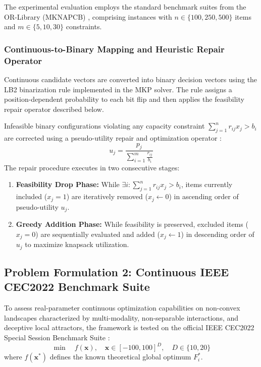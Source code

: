 \documentclass[review]{elsarticle}
\begin{document}
The experimental evaluation employs the standard benchmark suites from the OR-Library (MKNAPCB) \cite{chu1998genetic}, comprising instances with $n \in \{100, 250, 500\}$ items and $m \in \{5, 10, 30\}$ constraints.

\subsubsection{Continuous-to-Binary Mapping and Heuristic Repair Operator}

Continuous candidate vectors are converted into binary decision vectors using the LB2 binarization rule implemented in the MKP solver. The rule assigns a position-dependent probability to each bit flip and then applies the feasibility repair operator described below.

Infeasible binary configurations violating any capacity constraint $\sum_{j=1}^{n} r_{ij} x_j > b_i$ are corrected using a pseudo-utility repair and optimization operator \cite{chu1998genetic}:
\begin{equation}
u_j = \frac{p_j}{\displaystyle\sum_{i=1}^{m} \frac{r_{ij}}{b_i}}
\label{eq:pseudo_utility}
\end{equation}
The repair procedure executes in two consecutive stages:
\begin{enumerate}
    \item \textbf{Feasibility Drop Phase:} While $\exists i : \sum_{j=1}^n r_{ij} x_j > b_i$, items currently included ($x_j = 1$) are iteratively removed ($x_j \leftarrow 0$) in ascending order of pseudo-utility $u_j$.
    \item \textbf{Greedy Addition Phase:} While feasibility is preserved, excluded items ($x_j = 0$) are sequentially evaluated and added ($x_j \leftarrow 1$) in descending order of $u_j$ to maximize knapsack utilization.
\end{enumerate}




\subsection{Problem Formulation 2: Continuous IEEE CEC2022 Benchmark Suite}
\label{sec:cec2022_formulation}

To assess real-parameter continuous optimization capabilities on non-convex landscapes characterized by multi-modality, non-separable interactions, and deceptive local attractors, the framework is tested on the official IEEE CEC2022 Special Session Benchmark Suite \cite{suganthan2022sobo}:
\begin{equation}
\min \quad f(\mathbf{x}), \quad \mathbf{x} \in [-100, 100]^D, \quad D \in \{10, 20\}
\label{eq:cec_objective}
\end{equation}
where $f(\mathbf{x}^*)$ defines the known theoretical global optimum $F_i^*$.
\end{document}
